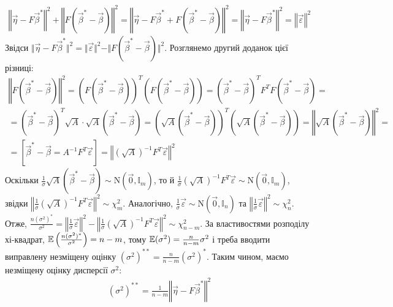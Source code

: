 \begin{gather*}
    \left\Vert \vec{\eta} - F \vec{\beta}^* \right\Vert^2 + \left\Vert F(\vec{\beta}^* - \vec{\beta}) \right\Vert^2 = 
    \left\Vert \vec{\eta} - F \vec{\beta}^* + F(\vec{\beta}^* - \vec{\beta})\right\Vert^2 = 
    \left\Vert \vec{\eta} - F \vec{\beta}^*\right\Vert^2 = \left\Vert \vec{\varepsilon}\right\Vert^2
\end{gather*}
Звідси $\Vert \vec{\eta} - F \vec{\beta}^* \Vert^2 = \Vert \vec{\varepsilon}\Vert^2 - \Vert F(\vec{\beta}^* - \vec{\beta}) \Vert^2$.
Розглянемо другий доданок цієї різниці:
\begin{gather*}
    \left\Vert F(\vec{\beta}^* - \vec{\beta}) \right\Vert^2  = \left(F(\vec{\beta}^* - \vec{\beta})\right)^T \left(F(\vec{\beta}^* - \vec{\beta})\right) = 
    (\vec{\beta}^* - \vec{\beta})^T F^T F (\vec{\beta}^* - \vec{\beta}) = \\ = 
    (\vec{\beta}^* - \vec{\beta})^T \sqrt{A} \cdot \sqrt{A} (\vec{\beta}^* - \vec{\beta}) = 
    \left(\sqrt{A}(\vec{\beta}^* - \vec{\beta})\right)^T \left(\sqrt{A}(\vec{\beta}^* - \vec{\beta})\right) =
    \left\Vert \sqrt{A}(\vec{\beta}^* - \vec{\beta}) \right\Vert^2 = \\ = 
    \left[\vec{\beta}^* - \vec{\beta} = A^{-1} F^T \vec{\varepsilon}\right] = 
    \left\Vert (\sqrt{A})^{-1} F^T \vec{\varepsilon} \right\Vert^2
\end{gather*}
Оскільки $\frac{1}{\sigma} \sqrt{A}(\vec{\beta}^* - \vec{\beta}) \sim \mathrm{N}(\vec{0}, \mathbb{I}_m)$, то й
$\frac{1}{\sigma}(\sqrt{A})^{-1} F^T \vec{\varepsilon} \sim \mathrm{N}(\vec{0}, \mathbb{I}_m)$, звідки $\left\Vert \frac{1}{\sigma} (\sqrt{A})^{-1} F^T \vec{\varepsilon} \right\Vert^2 \sim \chi^2_m$.
Аналогічно, $\frac{1}{\sigma} \vec{\varepsilon} \sim \mathrm{N}(\vec{0}, \mathbb{I}_n)$ та 
$\left\Vert\frac{1}{\sigma} \vec{\varepsilon}\right\Vert^2 \sim \chi^2_n$.
Отже, $\frac{n (\sigma^2)^*}{\sigma^2} = \left\Vert\frac{1}{\sigma} \vec{\varepsilon}\right\Vert^2 - \left\Vert \frac{1}{\sigma} (\sqrt{A})^{-1} F^T \vec{\varepsilon} \right\Vert^2 \sim \chi^2_{n-m}$.
За властивостями розподілу хі-квадрат, $\mathbb{E}\left(\frac{n (\sigma^2)^*}{\sigma^2}\right) = n-m$, тому $\mathbb{E}(\sigma^2) = \frac{n}{n-m} \sigma^2$ і треба вводити виправлену незміщену оцінку 
$(\sigma^2)^{**} = \frac{n}{n-m}(\sigma^2)^*$. Таким чином, маємо незміщену оцінку дисперсії $\sigma^2$:
\begin{gather}
    (\sigma^2)^{**} = \frac{1}{n-m} \left\Vert \vec{\eta} - F \vec{\beta}^* \right\Vert^2
\end{gather}

